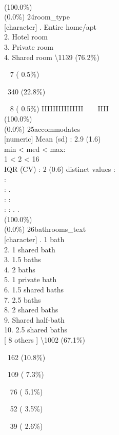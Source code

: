 \documentclass[
  journal,
]{IEEEtran}%
\begin{document}
~ ~ ~ \\
(100.0\%) \\
(0.0\%) \textbar{} \textbar{} 24\textbar room\_type\\
{[}character{]} . Entire home/apt\\
2. Hotel room\\
3. Private room\\
4. Shared room \textbar\textbackslash1139 (76.2\%)\\
\strut ~ 7 ( 0.5\%)\\
\strut ~340 (22.8\%)\\
\strut ~ 8 ( 0.5\%) \textbar{} \textbar IIIIIIIIIIIIIII ~ ~ IIII ~
\\
(100.0\%) \\
(0.0\%) \textbar{} \textbar{} 25\textbar accommodates\\
{[}numeric{]} \textbar Mean (sd) : 2.9 (1.6)\\
min \textless{} med \textless{} max:\\
1 \textless{} 2 \textless{} 16\\
IQR (CV) : 2 (0.6)  distinct values \textbar{} \textbar:\\
:\\
: .\\
: :\\
: : . . \\
(100.0\%) \\
(0.0\%) \textbar{} \textbar{} 26\textbar bathrooms\_text\\
{[}character{]} . 1 bath\\
2. 1 shared bath\\
3. 1.5 baths\\
4. 2 baths\\
5. 1 private bath\\
6. 1.5 shared baths\\
7. 2.5 baths\\
8. 2 shared baths\\
9. Shared half-bath\\
10. 2.5 shared baths\\
{[} 8 others {]} \textbar\textbackslash1002 (67.1\%)\\
\strut ~162 (10.8\%)\\
\strut ~109 ( 7.3\%)\\
\strut ~ 76 ( 5.1\%)\\
\strut ~ 52 ( 3.5\%)\\
\strut ~ 39 ( 2.6\%)\\
\end{document}
